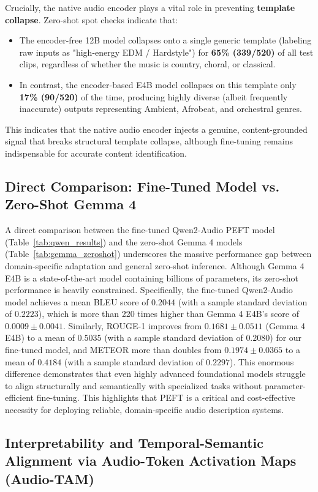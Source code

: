 \documentclass[12pt, conference, letterpaper]{IEEEtran}
\begin{document}
Crucially, the native audio encoder plays a vital role in preventing \textbf{template collapse}. Zero-shot spot checks indicate that:
\begin{itemize}
    \item The encoder-free 12B model collapses onto a single generic template (labeling raw inputs as "high-energy EDM / Hardstyle") for \textbf{65\% (339/520)} of all test clips, regardless of whether the music is country, choral, or classical.
    \item In contrast, the encoder-based E4B model collapses on this template only \textbf{17\% (90/520)} of the time, producing highly diverse (albeit frequently inaccurate) outputs representing Ambient, Afrobeat, and orchestral genres.
\end{itemize}
This indicates that the native audio encoder injects a genuine, content-grounded signal that breaks structural template collapse, although fine-tuning remains indispensable for accurate content identification.

\subsection{Direct Comparison: Fine-Tuned Model vs. Zero-Shot Gemma 4}
A direct comparison between the fine-tuned Qwen2-Audio PEFT model (Table~\ref{tab:qwen_results}) and the zero-shot Gemma 4 models (Table~\ref{tab:gemma_zeroshot}) underscores the massive performance gap between domain-specific adaptation and general zero-shot inference. Although Gemma 4 E4B is a state-of-the-art model containing billions of parameters, its zero-shot performance is heavily constrained. Specifically, the fine-tuned Qwen2-Audio model achieves a mean BLEU score of $0.2044$ (with a sample standard deviation of $0.2223$), which is more than 220 times higher than Gemma 4 E4B's score of $0.0009 \pm 0.0041$. Similarly, ROUGE-1 improves from $0.1681 \pm 0.0511$ (Gemma 4 E4B) to a mean of $0.5035$ (with a sample standard deviation of $0.2080$) for our fine-tuned model, and METEOR more than doubles from $0.1974 \pm 0.0365$ to a mean of $0.4184$ (with a sample standard deviation of $0.2297$). This enormous difference demonstrates that even highly advanced foundational models struggle to align structurally and semantically with specialized tasks without parameter-efficient fine-tuning. This highlights that PEFT is a critical and cost-effective necessity for deploying reliable, domain-specific audio description systems.

\subsection{Interpretability and Temporal-Semantic Alignment via Audio-Token Activation Maps (Audio-TAM)}
\label{sec:tam_analysis}
\end{document}

